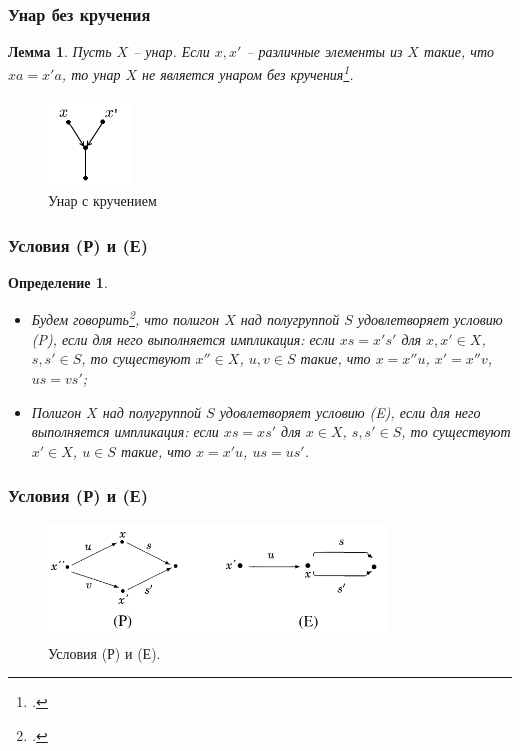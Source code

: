 \documentclass[11pt, notheorems]{beamer}
\newtheorem{definition}{Определение}
\newtheorem{lemma}{Лемма}
\begin{document}
\begin{frame}
	\frametitle{Унар без кручения}

	\begin{lemma}
		Пусть $X$ -- унар. Если $x, x'$ -- различные элементы из $X$ такие, что $x a = x' a$, то унар $X$ не является унаром без кручения\footcite[лемма 3]{pryan:unars_close_to_flat}.
	\end{lemma}

	\begin{figure}
		\center
		\includegraphics[width=0.2\textwidth]{torsion_free.png}
		\caption{Унар с кручением}
	\end{figure}
\end{frame}

\begin{frame}
	\frametitle{Условия (Р) и (Е)}

	\begin{definition}
		\begin{itemize}
			\item Будем говорить\footcite[определение III.9.4]{kilp}, что полигон $X$ над полугруппой $S$ удовлетворяет условию (P), если для него выполняется импликация: если $xs = x' s'$ для $x, x' \in X$, $s, s' \in S$, то существуют $x'' \in X$, $u,v \in S$ такие, что $x = x'' u$, $x' = x'' v$, $u s = v s'$;
			\item Полигон $X$ над полугруппой $S$ удовлетворяет условию (E), если для него выполняется импликация: если $x s = x s'$ для $x \in X$, $s, s' \in S$, то существуют $x' \in X$, $u \in S$ такие, что $x = x' u$, $us = us'$.
		\end{itemize}
	\end{definition}

\end{frame}

\begin{frame}
	\frametitle{Условия (Р) и (Е)}

	\begin{figure}
		\center
		\includegraphics[width=0.8\textwidth]{p_and_e}
		\caption{Условия (Р) и (Е).}
	\end{figure}
\end{frame}
\end{document}
